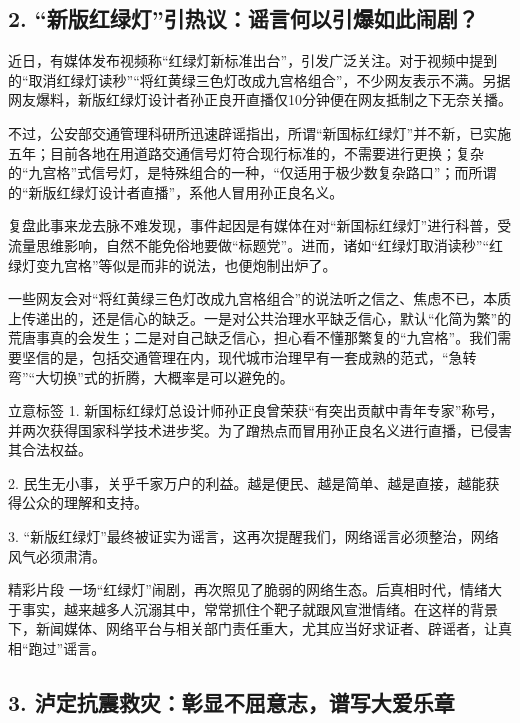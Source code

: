 \subsection*{2. “新版红绿灯”引热议：谣言何以引爆如此闹剧？}

近日，有媒体发布视频称“红绿灯新标准出台”，引发广泛关注。对于视频中提到的“取消红绿灯读秒”“将红黄绿三色灯改成九宫格组合”，不少网友表示不满。另据网友爆料，新版红绿灯设计者孙正良开直播仅10分钟便在网友抵制之下无奈关播。

不过，公安部交通管理科研所迅速辟谣指出，所谓“新国标红绿灯”并不新，已实施五年；目前各地在用道路交通信号灯符合现行标准的，不需要进行更换；复杂的“九宫格”式信号灯，是特殊组合的一种，“仅适用于极少数复杂路口”；而所谓的“新版红绿灯设计者直播”，系他人冒用孙正良名义。

复盘此事来龙去脉不难发现，事件起因是有媒体在对“新国标红绿灯”进行科普，受流量思维影响，自然不能免俗地要做“标题党”。进而，诸如“红绿灯取消读秒”“红绿灯变九宫格”等似是而非的说法，也便炮制出炉了。

一些网友会对“将红黄绿三色灯改成九宫格组合”的说法听之信之、焦虑不已，本质上传递出的，还是信心的缺乏。一是对公共治理水平缺乏信心，默认“化简为繁”的荒唐事真的会发生；二是对自己缺乏信心，担心看不懂那繁复的“九宫格”。我们需要坚信的是，包括交通管理在内，现代城市治理早有一套成熟的范式，“急转弯”“大切换”式的折腾，大概率是可以避免的。

\begin{quoteBox}{立意标签}
1. 新国标红绿灯总设计师孙正良曾荣获“有突出贡献中青年专家”称号，并两次获得国家科学技术进步奖。为了蹭热点而冒用孙正良名义进行直播，已侵害其合法权益。

2. 民生无小事，关乎千家万户的利益。越是便民、越是简单、越是直接，越能获得公众的理解和支持。

3. “新版红绿灯”最终被证实为谣言，这再次提醒我们，网络谣言必须整治，网络风气必须肃清。
\end{quoteBox}

\begin{quoteBox}{精彩片段}
一场“红绿灯”闹剧，再次照见了脆弱的网络生态。后真相时代，情绪大于事实，越来越多人沉溺其中，常常抓住个靶子就跟风宣泄情绪。在这样的背景下，新闻媒体、网络平台与相关部门责任重大，尤其应当好求证者、辟谣者，让真相“跑过”谣言。
\end{quoteBox}

\subsection*{3. 泸定抗震救灾：彰显不屈意志，谱写大爱乐章}

